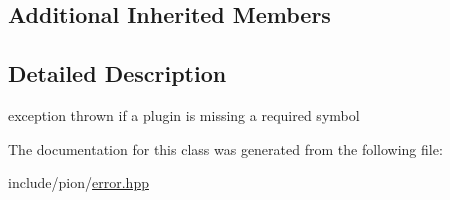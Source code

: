 \subsection*{Additional Inherited Members}


\subsection{Detailed Description}
exception thrown if a plugin is missing a required symbol 

The documentation for this class was generated from the following file\-:\begin{DoxyCompactItemize}
\item 
include/pion/\hyperlink{error_8hpp}{error.\-hpp}\end{DoxyCompactItemize}
